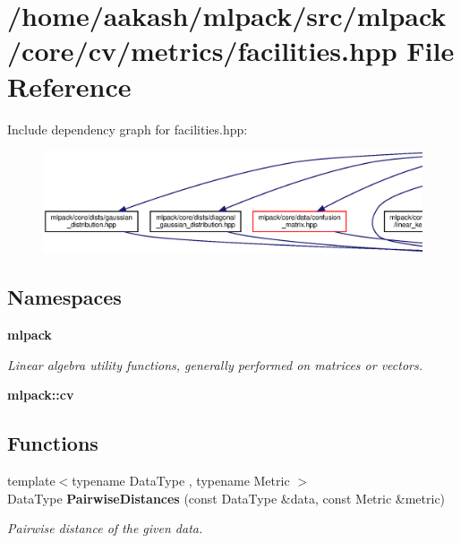 \section{/home/aakash/mlpack/src/mlpack/core/cv/metrics/facilities.hpp File Reference}
\label{facilities_8hpp}
Include dependency graph for facilities.\+hpp\+:
\nopagebreak
\begin{figure}[H]
\begin{center}
\leavevmode
\includegraphics[width=350pt]{facilities_8hpp__incl}
\end{center}
\end{figure}
\subsection*{Namespaces}
\begin{DoxyCompactItemize}
\item 
 \textbf{ mlpack}
\begin{DoxyCompactList}\small\item\em Linear algebra utility functions, generally performed on matrices or vectors. \end{DoxyCompactList}\item 
 \textbf{ mlpack\+::cv}
\end{DoxyCompactItemize}
\subsection*{Functions}
\begin{DoxyCompactItemize}
\item 
{\footnotesize template$<$typename Data\+Type , typename Metric $>$ }\\Data\+Type \textbf{ Pairwise\+Distances} (const Data\+Type \&data, const Metric \&metric)
\begin{DoxyCompactList}\small\item\em Pairwise distance of the given data. \end{DoxyCompactList}\end{DoxyCompactItemize}



